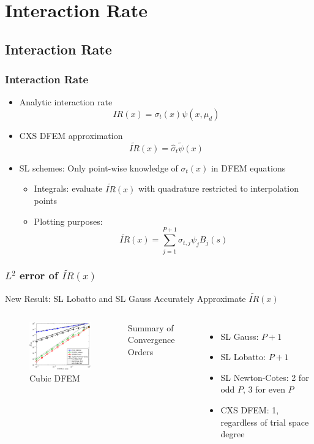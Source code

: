 \documentclass{beamer}
\newcommand{\be}{\begin{equation*}}   %
\newcommand{\ee}{\end{equation*}}
\newcommand{\B}[1]{\ensuremath{B_{#1} }}			%
\begin{document}
\section[Blading]{Interaction Rate}

\subsection{Interaction Rate}

\begin{frame}
\frametitle{Interaction Rate}
\begin{itemize}
\item Analytic interaction rate
\be
 IR(x) = \sigma_t(x) \psi(x,\mu_d)
\ee
\item CXS DFEM approximation
\be
\widetilde{IR}(x) = \hat{\sigma}_t \widetilde{\psi}(x)
\ee
\item SL schemes:  Only point-wise knowledge of $\sigma_t(x)$ in DFEM equations
\begin{itemize}
\item Integrals: evaluate $\widetilde{IR}(x)$ with quadrature restricted to interpolation points
\item Plotting purposes:
\be
\widetilde{IR}(x) = \sum_{j=1}^{P+1}{ \sigma_{t,j} \psi_j \B{j}(s) } 
\ee
\end{itemize}
\end{itemize}
\end{frame}

\begin{frame}
\frametitle{$L^2$ error of $\widetilde{IR}(x)$}

New Result: SL Lobatto and SL Gauss Accurately Approximate $\widetilde{IR}(x)$
\begin{columns}[c]
\begin{figure}
\includegraphics[width = 5cm]{P3_VarXS_E_I_L2.eps}
\caption{Cubic DFEM}
\end{figure}
Summary of Convergence Orders
\begin{itemize}
\item SL Gauss: $P+1$
\item SL Lobatto: $P+1$
\item SL Newton-Cotes: 2 for odd $P$, 3 for even $P$
\item CXS DFEM: 1, regardless of trial space degree
\end{itemize}
\end{columns}
\end{frame}
\end{document}
